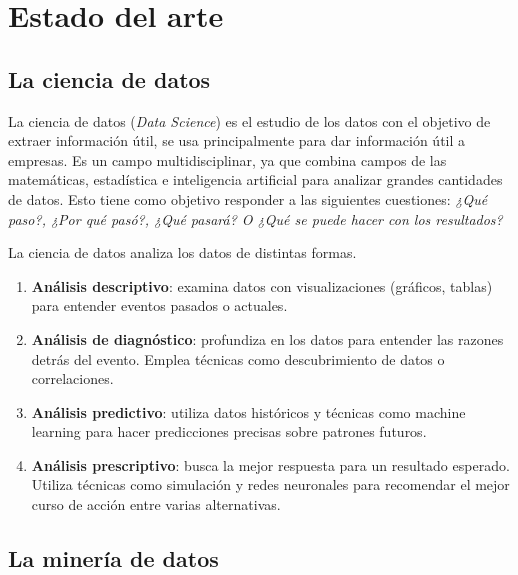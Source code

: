 \section{Estado del arte}
\label{ch:2:section:state-of-the-art}

\subsection{La ciencia de datos}

La ciencia de datos (\textit{Data Science}) es el estudio de los datos con el objetivo de extraer información útil, se usa principalmente para dar información útil a empresas. Es un campo multidisciplinar, ya que combina campos de las matemáticas, estadística e inteligencia artificial para analizar grandes cantidades de datos. Esto tiene como objetivo responder a las siguientes cuestiones: \textit{¿Qué paso?, ¿Por qué pasó?, ¿Qué pasará? O ¿Qué se puede hacer con los resultados?} \cite{aws-data-science}

La ciencia de datos analiza los datos de distintas formas.

\begin{enumerate}
    \item \textbf{Análisis descriptivo}: examina datos con visualizaciones (gráficos, tablas) para entender eventos pasados o actuales.
    \item \textbf{Análisis de diagnóstico}: profundiza en los datos para entender las razones detrás del evento. Emplea técnicas como descubrimiento de datos o correlaciones.
    \item \textbf{Análisis predictivo}: utiliza datos históricos y técnicas como machine learning para hacer predicciones precisas sobre patrones futuros.
    \item \textbf{Análisis prescriptivo}: busca la mejor respuesta para un resultado esperado. Utiliza técnicas como simulación y redes neuronales para recomendar el mejor curso de acción entre varias alternativas.
\end{enumerate}


\subsection{La minería de datos}

